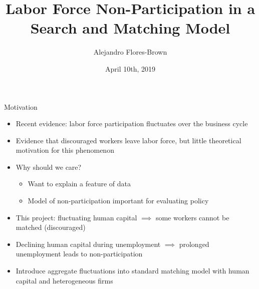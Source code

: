 \documentclass[lualatex]{beamer}
\title[Defining Labor Force Non-Participation]
{Labor Force Non-Participation in a Search and Matching Model}
\author[Alejandro Flores-Brown]
{Alejandro Flores-Brown}
\institute[WUSTL]
{
	Department of Economics\\
	Washington University in St. Louis
}
\date[Quant Macro, 4/10]
{April 10th, 2019}
\begin{document}
\begin{frame}
  \titlepage
\end{frame}

\begin{frame}{Motivation}
\begin{itemize}
	\item Recent evidence: labor force participation fluctuates \newline over the business cycle

	\item Evidence that discouraged workers leave labor force, but little theoretical motivation for this phenomenon

	\item Why should we care?

	\begin{itemize}

		\item Want to explain a feature of data

		\item Model of non-participation important for evaluating policy

	\end{itemize}

	\item This project: fluctuating human capital \newline $\implies$ some workers cannot be matched (discouraged)

	\item Declining human capital during unemployment $\implies$ prolonged unemployment leads to non-participation

	\item Introduce aggregate fluctuations into standard matching model with human capital and heterogeneous firms



\end{itemize}
\end{frame}
\end{document}
